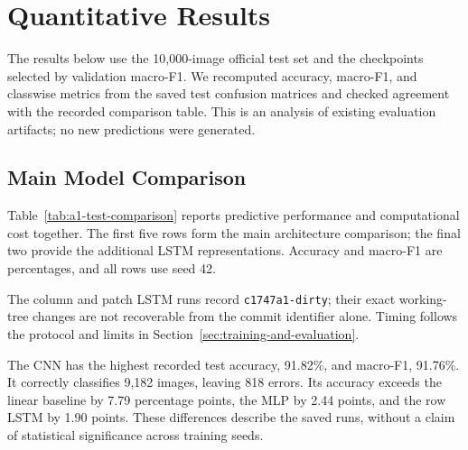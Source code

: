 \section{Quantitative Results}
\label{sec:quantitative-results}

The results below use the 10,000-image official test set and the checkpoints selected by validation macro-F1. We recomputed accuracy, macro-F1, and classwise metrics from the saved test confusion matrices and checked agreement with the recorded comparison table. This is an analysis of existing evaluation artifacts; no new predictions were generated.

\subsection{Main Model Comparison}

Table~\ref{tab:a1-test-comparison} reports predictive performance and computational cost together. The first five rows form the main architecture comparison; the final two provide the additional LSTM representations. Accuracy and macro-F1 are percentages, and all rows use seed 42.

\begin{table}[H]
    \centering
    \caption{Test results and recorded computational cost. Bold values identify the highest accuracy and macro-F1 among these runs. Training time includes validation and checkpointing; inference is amortized forward-pass time per image at batch size 128.}
    \label{tab:a1-test-comparison}
    \small
    \setlength{\tabcolsep}{4pt}
    
    \par\smallskip
    \begin{minipage}{\textwidth}
        \small \textdagger{} The column and patch LSTM runs record \texttt{c1747a1-dirty}; their exact working-tree changes are not recoverable from the commit identifier alone. Timing follows the protocol and limits in Section~\ref{sec:training-and-evaluation}.
    \end{minipage}
\end{table}

The CNN has the highest recorded test accuracy, 91.82\%, and macro-F1, 91.76\%. It correctly classifies 9,182 images, leaving 818 errors. Its accuracy exceeds the linear baseline by 7.79 percentage points, the MLP by 2.44 points, and the row LSTM by 1.90 points. These differences describe the saved runs, without a claim of statistical significance across training seeds.


